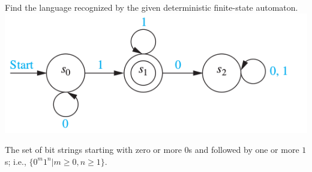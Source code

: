 \documentclass[../main.tex]{subfiles}
\begin{document}
Find the language recognized by the given deterministic finite-state automaton. \\
\includegraphics[width=\textwidth]{img/Q13_3_19}

\solution
The set of bit strings starting with zero or more $0$s and followed by one or more $1$s;
i.e., $\{0^m1^n | m \geq 0, n \geq 1\}$.
\end{document}
